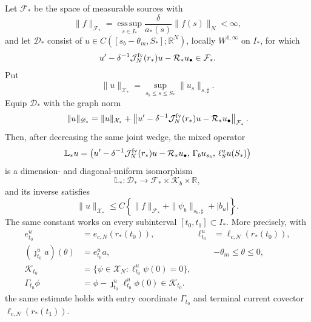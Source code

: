 \begin{theorem}
Let \(\mathcal F_*\) be the space of measurable sources with
\begin{equation}
 \|f\|_{\mathcal F_*}
 =\operatorname*{ess\,sup}_{s\in I_*}
       \frac{\delta}{a_*(s)}\|f(s)\|_N<\infty,   \label{eq:generated-core-source-norm}
\end{equation}
and let \(\mathscr D_*\) consist of
\(u\in C([s_b-\theta_m,S_*];\mathbb R^N)\), locally
\(W^{1,\infty}\) on \(I_*\), for which
\[
 u'-\delta^{-1}\mathcal J_N^{\rm fv}(r_*)u
       -\mathcal R_*u_\bullet\in\mathcal F_*.
\]
Put
\begin{equation}
 \|u\|_{\mathcal X_*}
 =\sup_{s_b\le s\le S_*}\|u_s\|_{s,\sharp}.     \label{eq:generated-core-solution-norm}
\end{equation}
Equip \(\mathscr D_*\) with the graph norm
\[
 \|u\|_{\mathscr D_*}
 =\|u\|_{\mathcal X_*}
 +\left\|u'-\delta^{-1}\mathcal J_N^{\rm fv}(r_*)u
       -\mathcal R_*u_\bullet\right\|_{\mathcal F_*}.
\]
Then, after decreasing the same joint wedge, the mixed operator
\begin{equation}
 \mathbb L_*u
 =\left(
 u'-\delta^{-1}\mathcal J_N^{\rm fv}(r_*)u
       -\mathcal R_*u_\bullet,\,
 \Gamma_bu_{s_b},\,
 \ell_S^uu(S_*)\right)                           \label{eq:generated-core-mixed-operator}
\end{equation}
is a dimension- and diagonal-uniform isomorphism
\begin{equation}
 \mathbb L_*:\mathscr D_*
 \longrightarrow\mathcal F_*\times\mathscr K_b\times\mathbb R,
                                                               \label{eq:generated-core-mixed-isomorphism}
\end{equation}
and its inverse satisfies
\begin{equation}
 \|u\|_{\mathcal X_*}
 \le C\left\{\|f\|_{\mathcal F_*}
       +\|\psi_b\|_{s_b,\sharp}+|b_u|\right\}.    \label{eq:generated-core-mixed-green-bound}
\end{equation}
The same constant works on every subinterval
\([t_0,t_1]\subset I_*\).  More precisely, with
\begin{equation}
\begin{aligned}
 e_{t_0}^u&=e_{c,N}(r_*(t_0)),&
 \ell_{t_0}^u&=\ell_{c,N}(r_*(t_0)),\\
 (\jmath_{t_0}^ua)(\theta)&=e_{t_0}^ua,
 &&-\theta_m\le\theta\le0,\\
 \mathscr K_{t_0}
 &=\{\psi\in\mathscr X_N:\ell_{t_0}^u\psi(0)=0\},\\
 \Gamma_{t_0}\phi
 &=\phi-\jmath_{t_0}^u\ell_{t_0}^u\phi(0)
 \in\mathscr K_{t_0}.
\end{aligned}                                    \label{eq:generated-core-subinterval-entry-coordinate}
\end{equation}
the same estimate holds with entry coordinate \(\Gamma_{t_0}\) and
terminal current covector \(\ell_{c,N}(r_*(t_1))\).


\end{theorem}
